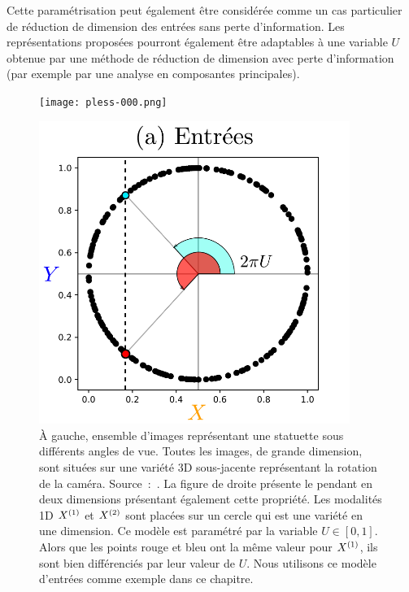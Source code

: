 \documentclass[../main]{subfiles}
\begin{document}
Cette paramétrisation peut également être considérée comme un cas particulier de réduction de dimension des entrées sans perte d'information.
Les représentations proposées pourront également être adaptables à une variable $U$ obtenue par une méthode de réduction de dimension avec perte d'information (par exemple par une analyse en composantes principales).

\begin{figure}
    \begin{minipage}{0.4\textwidth}
    \centering
    \texttt{[image: pless-000.png]}
    \end{minipage}
    \begin{minipage}{0.6\textwidth}
    \centering
    \includegraphics[width=0.9\textwidth]{2som_inp.pdf}
    \end{minipage}
    \caption{
        \`A gauche, ensemble d'images représentant une statuette sous différents angles de vue. Toutes les images, de grande dimension, sont situées sur une variété 3D sous-jacente représentant la rotation de la caméra. Source~:~\cite{Pless2009ASO}.
       La figure de droite présente le pendant en deux dimensions présentant également cette propriété. Les modalités 1D $X^{({1})}$ et $X^{({2})}$ sont placées sur un cercle qui est une variété en une dimension. Ce modèle est paramétré par la variable $U \in [0,1]$. Alors que les points rouge et bleu ont la même valeur pour $X^{({1})}$, ils sont bien différenciés par leur valeur de $U$.
       Nous utilisons ce modèle d'entrées comme exemple dans ce chapitre.
       \label{fig:U}}
\end{figure}
\end{document}
